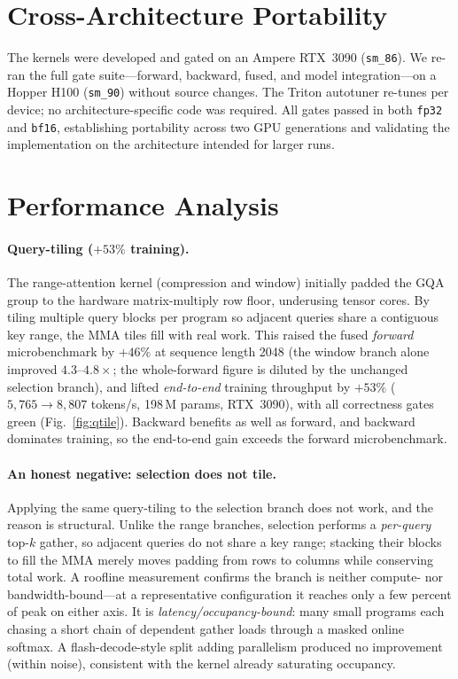 \documentclass[11pt]{article}
\begin{document}
\section{Cross-Architecture Portability}
\label{sec:portability}
The kernels were developed and gated on an Ampere RTX~3090 (\texttt{sm\_86}). We re-ran the full
gate suite---forward, backward, fused, and model integration---on a Hopper H100 (\texttt{sm\_90})
without source changes. The Triton autotuner re-tunes per device; no architecture-specific code was
required. All gates passed in both \texttt{fp32} and \texttt{bf16}, establishing portability across
two GPU generations and validating the implementation on the architecture intended for larger runs.

\section{Performance Analysis}
\label{sec:perf}
\paragraph{Query-tiling ($+53\%$ training).} The range-attention kernel (compression and window)
initially padded the GQA group to the hardware matrix-multiply row floor, underusing tensor cores.
By tiling multiple query blocks per program so adjacent queries share a contiguous key range, the
MMA tiles fill with real work. This raised the fused \emph{forward} microbenchmark by $+46\%$ at
sequence length 2048 (the window branch alone improved $4.3$--$4.8\times$; the whole-forward figure
is diluted by the unchanged selection branch), and lifted \emph{end-to-end} training throughput by
$+53\%$ ($5{,}765\to8{,}807$ tokens/s, 198\,M params, RTX~3090), with all correctness gates green
(Fig.~\ref{fig:qtile}). Backward benefits as well as forward, and backward dominates training, so
the end-to-end gain exceeds the forward microbenchmark.

\paragraph{An honest negative: selection does not tile.} Applying the same query-tiling to the
selection branch does not work, and the reason is structural. Unlike the range branches, selection
performs a \emph{per-query} top-$k$ gather, so adjacent queries do not share a key range; stacking
their blocks to fill the MMA merely moves padding from rows to columns while conserving total work.
A roofline measurement confirms the branch is neither compute- nor bandwidth-bound---at a
representative configuration it reaches only a few percent of peak on either axis. It is
\emph{latency/occupancy-bound}: many small programs each chasing a short chain of dependent gather
loads through a masked online softmax. A flash-decode-style split adding parallelism produced no
improvement (within noise), consistent with the kernel already saturating occupancy.
\end{document}
